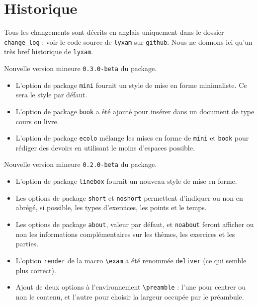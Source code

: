 \documentclass[12pt,a4paper]{scrartcl}
\begin{document}
\section{Historique}

Tous les changements sont décrits en anglais uniquement dans le dossier \verb+change_log+ : voir le code source de \verb+lyxam+ sur \verb+github+. Nous ne donnons ici qu'un très bref historique de \verb+lyxam+.

\begin{description}[leftmargin=1em]
    \setlength\itemsep{1em}

    \item[2017-12-02] Nouvelle version mineure \verb+0.3.0-beta+ du package.
    \begin{itemize}
        \item L'option de package \verb+mini+ fournit un style de mise en forme minimaliste. Ce sera le style par défaut.

        \item L'option de package \verb+book+ a été ajouté pour insérer dans un document de type cours ou livre.

        \item L'option de package \verb+ecolo+ mélange les mises en forme de \verb+mini+ et \verb+book+ pour rédiger des devoirs en utilisant le moins d'espaces possible.        
    \end{itemize}

    \item[2017-11-28] Nouvelle version mineure \verb+0.2.0-beta+ du package.
    \begin{itemize}
        \item L'option de package \verb+linebox+ fournit un nouveau style de mise en forme.

        \item Les options de package \verb+short+ et \verb+noshort+ permettent d'indiquer ou non en abrégé, si possible, les types d'exercices, les points et le temps.

        \item Les options de package \verb+about+, valeur par défaut, et \verb+noabout+ feront afficher ou non les informations complémentaires sur les thèmes, les exercices et les parties.

        \item L'option \verb+render+ de la macro \verb+\exam+ a été renommée \verb+deliver+ (ce qui semble plus correct).

        \item Ajout de deux options à l'environnement \verb+\preamble+ : l'une pour centrer ou non le contenu, et l'autre pour choisir la largeur occupée par le préambule.


\end{itemize}
\end{description}
\end{document}
